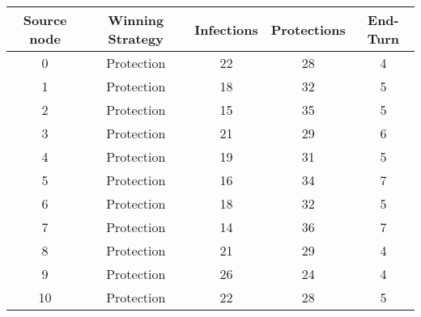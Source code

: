 \documentclass[results.tex]{subfiles}
\begin{document}
    \begin{center}
        \begin{tabular}{| c || c | c | c | c |}
            \hline
            {\bfseries Source node} & {\bfseries Winning Strategy} & {\bfseries Infections} & {\bfseries Protections}
            & {\bfseries End-Turn}
            \\  %
            \hline\hline
            0                       & Protection                   & 22                     & 28                      & 4                    \\
            \hline
            1                       & Protection                   & 18                     & 32                      & 5                    \\
            \hline
            2                       & Protection                   & 15                     & 35                      & 5                    \\
            \hline
            3                       & Protection                   & 21                     & 29                      & 6                    \\
            \hline
            4                       & Protection                   & 19                     & 31                      & 5                    \\
            \hline
            5                       & Protection                   & 16                     & 34                      & 7                    \\
            \hline
            6                       & Protection                   & 18                     & 32                      & 5                    \\
            \hline
            7                       & Protection                   & 14                     & 36                      & 7                    \\
            \hline
            8                       & Protection                   & 21                     & 29                      & 4                    \\
            \hline
            9                       & Protection                   & 26                     & 24                      & 4                    \\
            \hline
            10                      & Protection                   & 22                     & 28                      & 5                    \\

\end{tabular}
\end{center}
\end{document}
